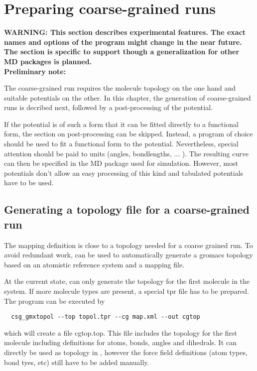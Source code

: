 \chapter{Preparing coarse-grained runs}
\label{sec:usage:cgrun}
\textbf{WARNING: This section describes experimental features. The exact names and options of the program might change in the near future.  The section is specific to \gromacs support though a generalization for other MD packages is planned.}
$$$$
\textbf{Preliminary note:}

The coarse-grained run requires the molecule topology on the one hand and suitable potentials on the other. In this chapter, the generation of coarse-grained runs is decribed next, followed by a post-processing of the potential.

If the potential is of such a form that it can be fitted directly to a functional form, the section on post-processing can be skipped. Instead, a program of choice should be used to fit a functional form to the potential. Nevertheless, special attention should be paid to units (angles, bondlengths, ... \todo). The resulting curve can then be specified in the MD package used for simulation. However, most potentials don't allow an easy processing of this kind and tabulated potentials have to be used.

\section{Generating a topology file for a coarse-grained run}
The mapping definition is close to a topology needed for a coarse grained run. To avoid redundant work,  can be used to automatically generate a gromacs topology based on an atomistic reference system and a mapping file.

At the current state,  can only generate the topology for the first molecule in the system. If more molecule types are present, a special tpr file has to be prepared. The program can be executed by
\begin{verbatim}
  csg_gmxtopol --top topol.tpr --cg map.xml --out cgtop
\end{verbatim}
which will create a file cgtop.top. This file includes the topology for the first molecule including definitions for atoms, bonds, angles and dihedrals. It can directly be used as topology in \gromacs , however the force field definitions (atom types, bond tyes, etc) still have to be added manually.

